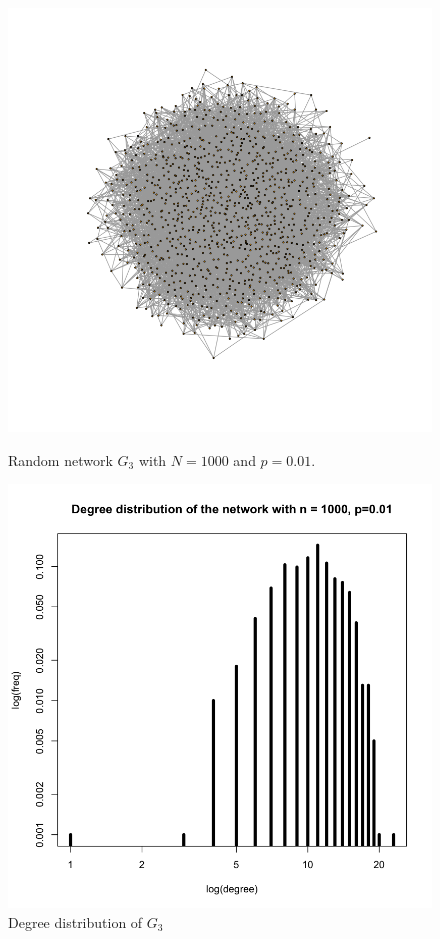 \documentclass[draftcls,12pt,onecolumn]{IEEEtran}
\begin{document}
\begin{figure}[H]
\centering
\begin{minipage}[t]{0.48\textwidth}
\centering
\includegraphics[scale=0.2]{figures_part1_1/output_5_0.png}
\caption{Random network $G_3$ with $N=1000$ and $p=0.01$.}
\label{fig5}
\end{minipage}
\begin{minipage}[t]{0.48\textwidth}
\centering
\includegraphics[scale=0.2]{figures_part1_1/output_10_1.png}
\caption{Degree distribution of $G_3$}
\label{fig6}
\end{minipage}
\end{figure}
\end{document}
